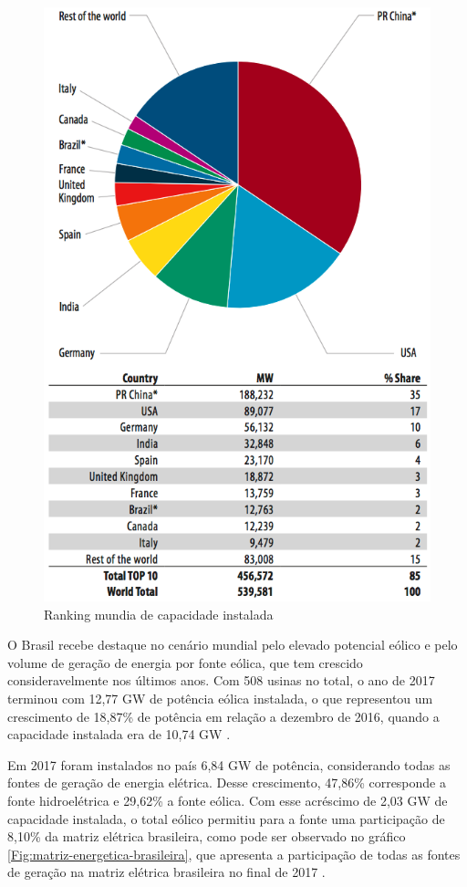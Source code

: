 \begin{figure}[htbp!] \begin{center}
\includegraphics[width=0.75\linewidth]{./figuras/grafico-capacidade-instalada-mundo}
\caption{Ranking mundia de capacidade instalada}
\label{Fig:ranking-mundial-capacidade-instalada}
\end{center} 
\end{figure}

O Brasil recebe destaque no cenário mundial pelo elevado potencial eólico e pelo volume de geração de energia por fonte eólica, que tem crescido consideravelmente nos últimos anos. Com 508 usinas no total, o ano de 2017 terminou com 12,77 GW de potência eólica instalada, o que representou um crescimento de 18,87\% de potência em relação a dezembro de 2016, quando a capacidade instalada era de 10,74 GW \cite{boletim-anual-geracao-2017}.

Em 2017 foram instalados no país 6,84 GW de potência, considerando todas as fontes de geração de energia elétrica. Desse crescimento, 47,86\% corresponde a fonte hidroelétrica e 29,62\% a fonte eólica. Com esse acréscimo de 2,03 GW de capacidade instalada, o total eólico permitiu para a fonte uma participação de 8,10\% da matriz elétrica brasileira, como pode ser observado no gráfico \ref{Fig:matriz-energetica-brasileira}, que apresenta a participação de todas as fontes de geração na matriz elétrica brasileira no final de 2017 \cite{boletim-anual-geracao-2017}.

